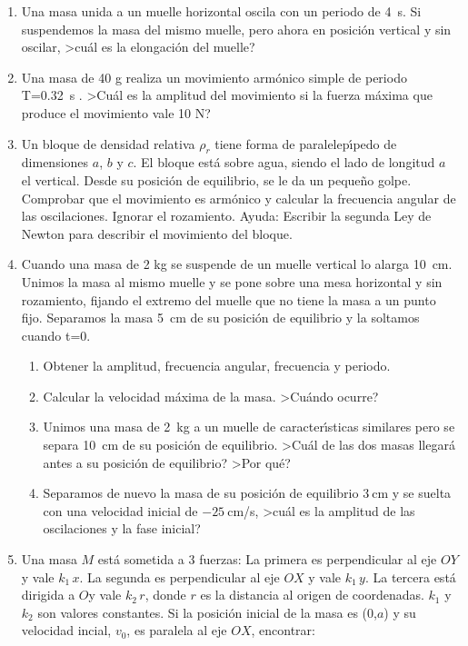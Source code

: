 \documentclass[12pt,twoside]{article}
\begin{document}
\begin{enumerate}
\item
Una masa unida a un muelle horizontal oscila con un periodo de 4~s.
Si suspendemos la masa del mismo muelle, pero ahora en posici\'{o}n vertical
y sin oscilar, >cu\'{a}l es la elongaci\'{o}n del muelle?

\item
Una masa de 40 g realiza un movimiento arm\'{o}nico simple de periodo
T=0.32~s .
>Cu\'{a}l es la amplitud del movimiento si la fuerza m\'{a}xima 
que produce el movimiento vale 10 N?

\item
Un bloque de densidad relativa $\rho_r$  tiene forma de 
paralelep\'{\i}pedo de dimensiones  $a$, $b$ y $c$.
El bloque est\'{a} sobre agua, siendo el lado de longitud $a$
el vertical. Desde su posici\'{o}n de equilibrio, se le da un peque\~{n}o
golpe. Comprobar que el movimiento es arm\'{o}nico y
calcular la frecuencia angular de las oscilaciones. Ignorar el 
rozamiento. Ayuda: Escribir la segunda Ley de Newton para 
describir el movimiento del bloque.

\item
Cuando una masa de 2 kg se suspende de un muelle vertical lo alarga 10~cm.
Unimos la masa al mismo muelle y se pone sobre una mesa horizontal
y sin rozamiento, fijando el extremo del muelle que no tiene la masa a 
un punto fijo.
Separamos la masa 5~cm de su posici\'{o}n de equilibrio y la soltamos cuando
 t=0.
\begin {enumerate}
\item Obtener la amplitud, frecuencia angular, frecuencia y periodo.
\item Calcular la velocidad m\'{a}xima de la masa. >Cu\'{a}ndo ocurre?
\item Unimos una masa de 2~kg a un muelle de caracter\'{\i}sticas similares
pero se separa 10~cm de su posici\'{o}n de equilibrio. >Cu\'{a}l de las dos 
masas llegar\'{a} antes a su posici\'{o}n de equilibrio? >Por qu\'{e}? 
\item Separamos de nuevo la masa de su posici\'{o}n de equilibrio 
$3~$cm y se suelta con una velocidad inicial de $-25~$cm/s,
>cu\'{a}l  es la amplitud de las oscilaciones y la fase inicial?
\end{enumerate}

\item
Una masa $M$ est\'{a} sometida a 3 fuerzas:
La primera es perpendicular al eje $OY$ y vale $k_1\,x$.
La segunda es perpendicular al eje $OX$ y vale  $k_1\,y$.
La tercera est\'{a} dirigida a $O$y vale  $k_2\,r$, donde 
$r$ es la distancia al origen de coordenadas.
$k_1$ y $k_2$ son valores constantes.
Si la posici\'{o}n inicial de la masa es 
 (0,$a$) y su velocidad incial, $v_0$, es paralela al eje $OX$, encontrar:
\begin{minipage}{.49\linewidth}


\end{minipage}
\end{enumerate}
\end{document}
